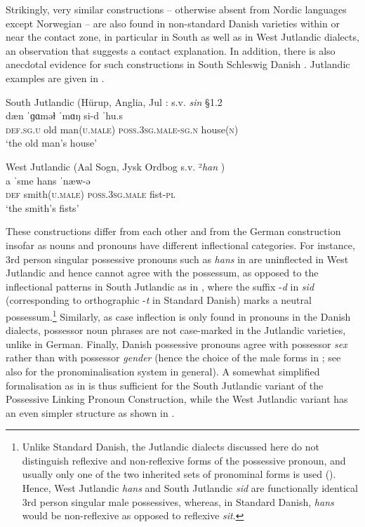 \documentclass[output=paper]{langsci/langscibook}
\begin{document}
Strikingly, very similar constructions – otherwise absent from Nordic languages except Norwegian – are also found in non-standard Danish varieties within or near the contact zone, in particular in South as well as in West Jutlandic dialects, an observation that suggests a contact explanation. In addition, there is also anecdotal evidence for such constructions in South Schleswig Danish \citep{Christophersen.1985}. Jutlandic examples are given in .


 
\ea\label{ex:hoeder:17}
	\ea\label{ex:hoeder:17a}
	South Jutlandic (Hürup, Anglia, Jul \citealt{JulNielsen.1995}: s.v. \textit{sin} \S 1.2\\
	\gll dæn{} ˈɡɑməɫ ˈmɑŋ si-d ˈhu.s\\
     \textsc{def.sg.u} old man(\textsc{u.male}){} \textsc{poss.3sg.male-sg.n} house(\textsc{n})\\
	\glt `the{} old man’s house'

	\ex\label{ex:hoeder:17b}
	West Jutlandic (Aal Sogn, Jysk Ordbog s.v. ²\textit{han} )\\
	\gll a ˈsme hans ˈnæw-ə\\
     \textsc{def} smith(\textsc{u.male}){} \textsc{poss.3sg.male} fist-\textsc{pl}\\
	\glt `the smith’s fists'
\z
\z

These constructions differ from each other and from the German construction insofar as nouns and pronouns have different inflectional categories. For instance, 3rd person singular possessive pronouns such as \textit{hans} in  are uninflected in West Jutlandic and hence cannot agree with the possessum, as opposed to the inflectional patterns in South Jutlandic as in , where the suffix -\textit{d} in \textit{sid} (corresponding to orthographic -\textit{t} in Standard Danish) marks a neutral possessum.\footnote{Unlike Standard Danish, the Jutlandic dialects discussed here do not distinguish reflexive and non-reflexive forms of the possessive pronoun, and usually only one of the two inherited sets of pronominal forms is used (\citealt{JulNielsen.1986}). Hence, West Jutlandic \textit{hans} and South Jutlandic \textit{sid} are functionally identical 3rd person singular male possessives, whereas, in Standard Danish, \textit{hans} would be non-reflexive as opposed to reflexive \textit{sit}.}\textsuperscript{} Similarly, as case inflection is only found in pronouns in the Danish dialects, possessor noun phrases are not case-marked in the Jutlandic varieties, unlike in German. Finally, Danish possessive pronouns agree with possessor \textit{sex} rather than with possessor \textit{gender} (hence the choice of the male forms in ; see also  for the pronominalisation system in general). A somewhat simplified formalisation as in  is thus sufficient{} for the South Jutlandic variant of the Possessive Linking Pronoun Construction, while the West Jutlandic variant has an even simpler structure as shown in .
\end{document}
